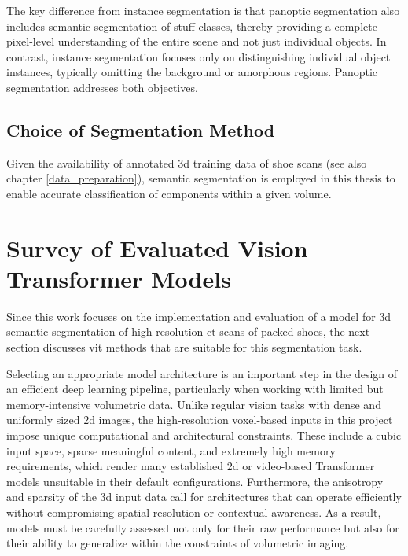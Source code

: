 \medskip

The key difference from instance segmentation is that panoptic segmentation also includes semantic segmentation of stuff classes, thereby providing a complete pixel-level understanding of the entire scene and not just individual objects. In contrast, instance segmentation focuses only on distinguishing individual object instances, typically omitting the background or amorphous regions. Panoptic segmentation addresses both objectives.


\subsection{Choice of Segmentation Method}
Given the availability of annotated \gls{3d} training data of shoe scans (see also chapter \ref{data_preparation}), semantic segmentation is employed in this thesis to enable accurate classification of components within a given volume. 



\section{Survey of Evaluated Vision Transformer Models}
Since this work focuses on the implementation and evaluation of a model for \gls{3d} semantic segmentation of high-resolution \gls{ct} scans of packed shoes, the next section discusses \gls{vit} methods that are suitable for this segmentation task.

\medskip

Selecting an appropriate model architecture is an important step in the design of an efficient deep learning pipeline, particularly when working with limited but memory-intensive volumetric data. Unlike regular vision tasks with dense and uniformly sized \gls{2d} images, the high-resolution voxel-based inputs in this project impose unique computational and architectural constraints. These include a cubic input space, sparse meaningful content, and extremely high memory requirements, which render many established \gls{2d} or video-based Transformer models unsuitable in their default configurations. Furthermore, the anisotropy and sparsity of the \gls{3d} input data call for architectures that can operate efficiently without compromising spatial resolution or contextual awareness. As a result, models must be carefully assessed not only for their raw performance but also for their ability to generalize within the constraints of volumetric imaging.

